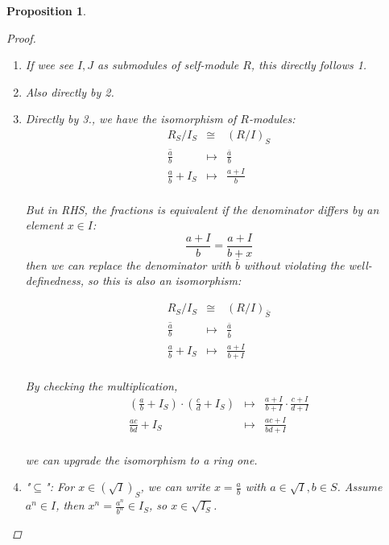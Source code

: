 \documentclass[a4paper]{article}
\theoremstyle{mystyle}
\newtheorem{prop}{Proposition}
\begin{document}
\begin{prop}
\begin{proof}
\begin{enumerate}
        The map $N_S \to M_S$ is injective means $N_S$ can be regarded as a 
        submodule of $M_S$. Again by 1st isomorphism theorem, 
        we have $M_S / N_S \cong (M/N)_S$.

      \item
        If wee see $I, J$ as submodules of self-module $R$, this directly 
        follows 1.

      \item Also directly by 2.

      \item 
        Directly by 3., we have the isomorphism of $R$-modules:
        \[
          \begin{array}{ccc}
            R_S / I_S &\cong& (R/I)_S \\
            \overline{\frac{a}{b}} &\longmapsto& \frac{\bar{a}}{b} \\
            \frac{a}{b} + I_S &\longmapsto& \frac{a + I}{b} \\
          \end{array}
        \]

        But in RHS, the fractions is equivalent if the denominator differs by 
        an element $x \in I$:
        \[
          \frac{a+I}{b} = \frac{a+I}{b+x}
        \]
        then we can replace the denominator with $\bar{b}$ without violating the
        well-definedness, so this is also an isomorphism:

        \[
          \begin{array}{ccc}
            R_S / I_S &\cong& (R/I)_{\bar{S}} \\
            \overline{\frac{a}{b}} &\longmapsto& \frac{\bar{a}}{\bar{b}} \\
            \frac{a}{b} + I_S &\longmapsto& \frac{a + I}{b + I} \\
          \end{array}
        \]

        By checking the multiplication,
        \[
          \begin{array}{ccc}
            (\frac{a}{b} + I_S) \cdot (\frac{c}{d} + I_S)
            &\longmapsto& \frac{a + I}{b + I} \cdot \frac{c+I}{d+I}\\
            \frac{ac}{bd} + I_S &\longmapsto& \frac{ac + I}{bd + I} \\
          \end{array}
        \]

        we can upgrade the isomorphism to a ring one.

      \item
        "$\subseteq$":
        For $x \in (\sqrt{I})_S$, we can write $x = \frac{a}{b}$ with 
        $a \in \sqrt{I}, b \in S$. Assume $a^n \in I$, then
        $x^n = \frac{a^n}{b^n} \in I_S$, so $x \in \sqrt{I_S}$.


\end{enumerate}
\end{proof}
\end{prop}
\end{document}
